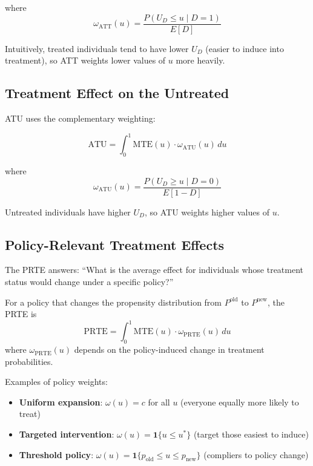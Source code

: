 where
\begin{equation}
\omega_{\text{ATT}}(u) = \frac{P(U_D \leq u \mid D=1)}{E[D]}
\end{equation}

Intuitively, treated individuals tend to have lower $U_D$ (easier to induce into treatment), so ATT weights lower values of $u$ more heavily.

\subsection{Treatment Effect on the Untreated}

ATU uses the complementary weighting:

\begin{equation}
\text{ATU} = \int_0^1 \text{MTE}(u) \cdot \omega_{\text{ATU}}(u) \, du
\end{equation}

where
\begin{equation}
\omega_{\text{ATU}}(u) = \frac{P(U_D \geq u \mid D=0)}{E[1-D]}
\end{equation}

Untreated individuals have higher $U_D$, so ATU weights higher values of $u$.

\subsection{Policy-Relevant Treatment Effects}

The PRTE answers: ``What is the average effect for individuals whose treatment status would change under a specific policy?''

\begin{definition}
\label{def:prte}
For a policy that changes the propensity distribution from $P^{\text{old}}$ to $P^{\text{new}}$, the PRTE is
\begin{equation}
\text{PRTE} = \int_0^1 \text{MTE}(u) \cdot \omega_{\text{PRTE}}(u) \, du
\end{equation}
where $\omega_{\text{PRTE}}(u)$ depends on the policy-induced change in treatment probabilities.
\end{definition}

Examples of policy weights:

\begin{itemize}
\item \textbf{Uniform expansion}: $\omega(u) = c$ for all $u$ (everyone equally more likely to treat)
\item \textbf{Targeted intervention}: $\omega(u) = \mathbf{1}\{u \leq u^*\}$ (target those easiest to induce)
\item \textbf{Threshold policy}: $\omega(u) = \mathbf{1}\{p_{\text{old}} \leq u \leq p_{\text{new}}\}$ (compliers to policy change)
\end{itemize}

